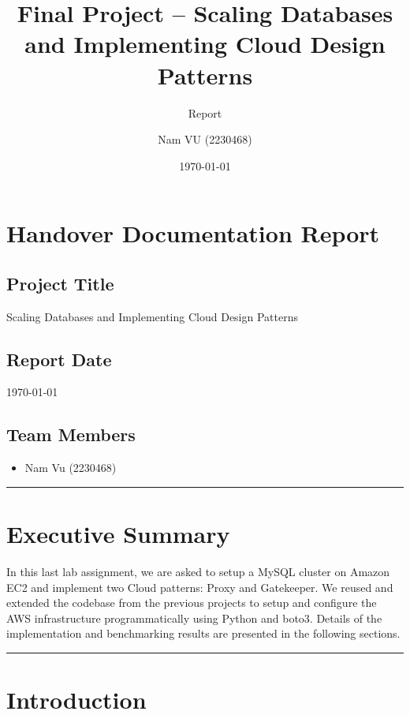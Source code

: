 \documentclass[letterpaper,headings=standardclasses,parskip=half]{scrartcl}
\title{Final Project – Scaling Databases and Implementing Cloud Design Patterns}
\subtitle{Report}
\author{Nam VU (2230468)}
\date{\today}
\begin{document}
\maketitle
\thispagestyle{empty}

\clearpage
{}

\tableofcontents

\clearpage

\section*{Handover Documentation Report}

\subsection*{Project Title}

Scaling Databases and Implementing Cloud Design Patterns

\subsection*{Report Date}

\today

\subsection*{Team Members}

\begin{itemize}
    \item Nam Vu (2230468)
\end{itemize}

\noindent\rule{\textwidth}{0.3pt}

\section*{Executive Summary}

In this last lab assignment, we are asked to setup a MySQL cluster on Amazon EC2 and implement two Cloud patterns: Proxy and Gatekeeper.
We reused and extended the codebase from the previous projects to setup and configure the AWS infrastructure programmatically using Python and boto3. Details of the implementation and benchmarking results are presented in the following sections.

\noindent\rule{\textwidth}{0.3pt}

\section{Introduction}
\end{document}
